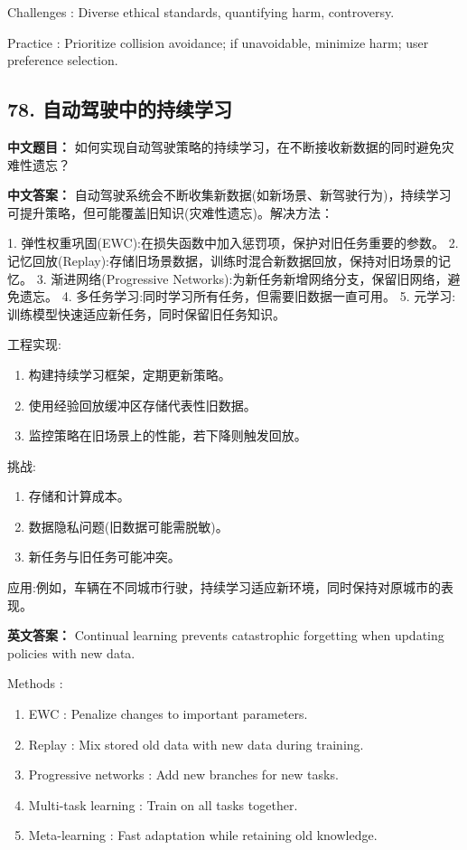 \documentclass[10pt,a4paper]{ctexart}
\begin{document}
 Challenges : Diverse ethical standards, quantifying harm, controversy.

 Practice : Prioritize collision avoidance; if unavoidable, minimize harm; user preference selection.

\subsection*{78. 自动驾驶中的持续学习}
\textbf{中文题目：} 如何实现自动驾驶策略的持续学习，在不断接收新数据的同时避免灾难性遗忘？

\textbf{中文答案：}  
自动驾驶系统会不断收集新数据(如新场景、新驾驶行为)，持续学习可提升策略，但可能覆盖旧知识(灾难性遗忘)。解决方法：

1.  弹性权重巩固(EWC):在损失函数中加入惩罚项，保护对旧任务重要的参数。
2.  记忆回放(Replay):存储旧场景数据，训练时混合新数据回放，保持对旧场景的记忆。
3.  渐进网络(Progressive Networks):为新任务新增网络分支，保留旧网络，避免遗忘。
4.  多任务学习:同时学习所有任务，但需要旧数据一直可用。
5.  元学习:训练模型快速适应新任务，同时保留旧任务知识。

 工程实现:
\begin{enumerate}
    \item 构建持续学习框架，定期更新策略。
    \item 使用经验回放缓冲区存储代表性旧数据。
    \item 监控策略在旧场景上的性能，若下降则触发回放。
\end{enumerate}

 挑战:
\begin{enumerate}
    \item 存储和计算成本。
    \item 数据隐私问题(旧数据可能需脱敏)。
    \item 新任务与旧任务可能冲突。
\end{enumerate}

 应用:例如，车辆在不同城市行驶，持续学习适应新环境，同时保持对原城市的表现。

\textbf{英文答案：}  
Continual learning prevents catastrophic forgetting when updating policies with new data.

 Methods :
\begin{enumerate}
    \item EWC : Penalize changes to important parameters.
    \item Replay : Mix stored old data with new data during training.
    \item Progressive networks : Add new branches for new tasks.
    \item Multi-task learning : Train on all tasks together.
    \item Meta-learning : Fast adaptation while retaining old knowledge.
\end{enumerate}
\end{document}
